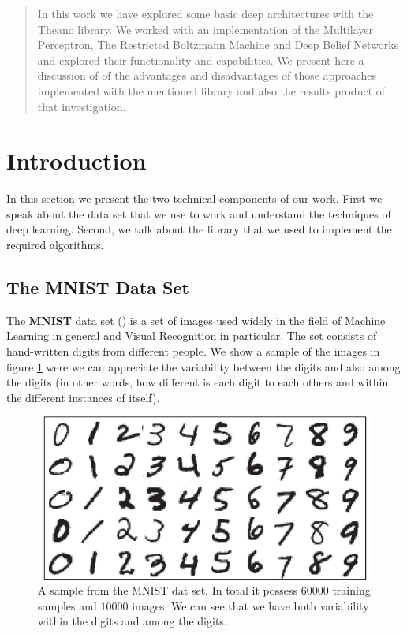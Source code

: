 \documentclass[11pt,a4paper]{article}
\begin{document}
\begin{abstract}
In this work we have explored some basic deep architectures with the Theano library. We worked with an implementation of the Multilayer Perceptron, The Restricted Boltzmann Machine and Deep Belief Networks and explored their functionality and capabilities. We present here a discussion of of the advantages and disadvantages of those approaches implemented with the mentioned library and also the results product of that investigation. 
\end{abstract}

\section{Introduction}

In this section we present the two technical components of our work. First we speak about the data set that we use to work and understand the techniques of deep learning. Second,  we talk about the library that we used to implement the required algorithms. 

\subsection{The MNIST Data Set}
The \textbf{MNIST}  data set (\cite{lecun1998mnist}) is a set of images used widely in the field of Machine Learning in general and Visual Recognition in particular. The set consists of hand-written digits from different people. We show a sample of the images in figure \ref{fig:mnist_example} were we can appreciate the variability between the digits and also among the digits (in other words, how different is each digit to each others and within the different instances of itself). 

\begin{center}
\begin{figure}[H]
\centering
\includegraphics[scale=.45]{mnist_example.png} 
\caption{A sample from the MNIST dat set. In total it possess $60000$ training samples and $10000$ images.  We can see that we have both variability within the digits and among the digits.}
\label{fig:mnist_example}
\end{figure} 
\end{center}
\end{document}
